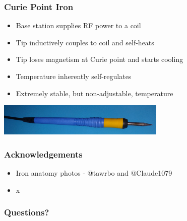 \documentclass{beamer}
\begin{document}
\begin{frame}
\frametitle{Curie Point Iron}
\begin{itemize}
\item Base station supplies RF power to a coil
\item Tip inductively couples to coil and self-heats
\item Tip loses magnetism at Curie point and starts cooling
\item Temperature inherently self-regulates
\item Extremely stable, but non-adjustable, temperature
\end{itemize}
\begin{center}
\includegraphics[width=8cm,keepaspectratio]{curie-iron.jpg}
\end{center}
\end{frame}

\begin{frame}
\frametitle{Acknowledgements}
\begin{itemize}
\item Iron anatomy photos - @tawrbo and @Claude1079
\item x
\end{itemize}
\end{frame}

\begin{frame}
\frametitle{Questions?}
\end{frame}
\end{document}
